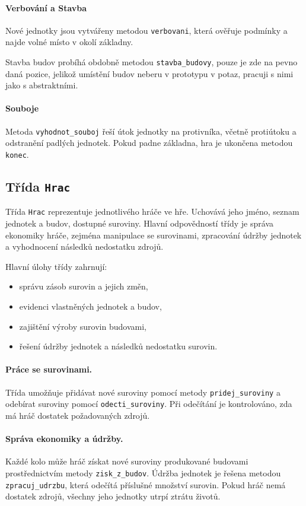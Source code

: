 \paragraph{Verbování a Stavba}
Nové jednotky jsou vytvářeny metodou \texttt{verbovani}, která ověřuje podmínky a najde volné místo v okolí základny. 

Stavba budov probíhá obdobně metodou \texttt{stavba\_budovy}, pouze je zde na pevno daná pozice, jelikož umístění budov neberu v prototypu v potaz, pracuji 
s nimi jako s abstraktními.

\paragraph{Souboje}
Metoda \texttt{vyhodnot\_souboj} řeší útok jednotky na protivníka, včetně protiútoku a odstranění padlých jednotek. Pokud padne základna, hra je ukončena metodou \texttt{konec}.


\subsection{Třída \texttt{Hrac}}

Třída \texttt{Hrac} reprezentuje jednotlivého hráče ve hře. Uchovává jeho jméno, seznam jednotek a budov, dostupné suroviny. Hlavní odpovědností třídy je správa ekonomiky hráče, zejména manipulace se surovinami, zpracování údržby jednotek a vyhodnocení následků nedostatku zdrojů.

Hlavní úlohy třídy zahrnují: 
\begin{itemize} 
    \item správu zásob surovin a jejich změn, 
    \item evidenci vlastněných jednotek a budov, 
    \item zajištění výroby surovin budovami, 
    \item řešení údržby jednotek a následků nedostatku surovin. 
\end{itemize}

\paragraph{Práce se surovinami.}
Třída umožňuje přidávat nové suroviny pomocí metody \texttt{pridej\_suroviny} a odebírat suroviny pomocí \texttt{odecti\_suroviny}. Při odečítání je kontrolováno, zda má hráč dostatek požadovaných zdrojů.

\paragraph{Správa ekonomiky a údržby.}
Každé kolo může hráč získat nové suroviny produkované budovami prostřednictvím metody \texttt{zisk\_z\_budov}. Údržba jednotek je řešena metodou \texttt{zpracuj\_udrzbu}, která odečítá příslušné množství surovin. Pokud hráč nemá dostatek zdrojů, všechny jeho jednotky utrpí ztrátu životů.

